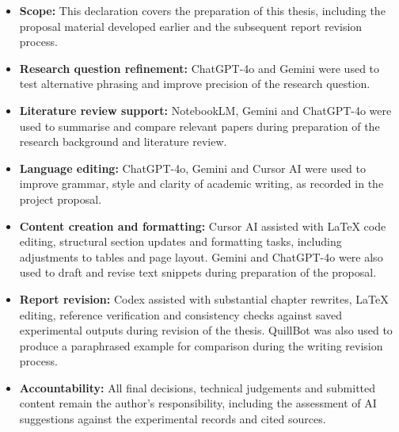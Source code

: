 \begin{itemize}[leftmargin=*]
\item \textbf{Scope:} This declaration covers the preparation of this thesis,
including the proposal material developed earlier and the subsequent report
revision process.
\item \textbf{Research question refinement:} ChatGPT-4o and Gemini were used
to test alternative phrasing and improve precision of the research question.
\item \textbf{Literature review support:} NotebookLM, Gemini and ChatGPT-4o
were used to summarise and compare relevant papers during preparation of the
research background and literature review.
\item \textbf{Language editing:} ChatGPT-4o, Gemini and Cursor AI were used
to improve grammar, style and clarity of academic writing, as recorded in the
project proposal.
\item \textbf{Content creation and formatting:} Cursor AI assisted with
\LaTeX{} code editing, structural section updates and formatting tasks,
including adjustments to tables and page layout. Gemini and ChatGPT-4o were
also used to draft and revise text snippets during preparation of the proposal.
\item \textbf{Report revision:} Codex assisted with substantial chapter
rewrites, \LaTeX{} editing, reference verification and consistency checks
against saved experimental outputs during revision of the thesis. QuillBot
was also used to produce a paraphrased example for comparison during the
writing revision process.
\item \textbf{Accountability:} All final decisions, technical judgements and
submitted content remain the author's responsibility, including the assessment
of AI suggestions against the experimental records and cited sources.
\end{itemize}

